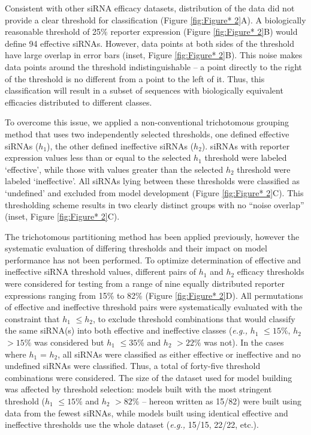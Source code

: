 \documentclass{report}
\begin{document}
 Consistent with other siRNA efficacy datasets, distribution of the data did not provide a clear threshold for classification (Figure \ref{fig:Figure* 2}A). A biologically reasonable threshold of 25\% reporter expression (Figure \ref{fig:Figure* 2}B) would define 94 effective siRNAs. However, data points at both sides of the threshold have large overlap in error bars (inset, Figure \ref{fig:Figure* 2}B). This noise makes data points around the threshold indistinguishable – a point directly to the right of the threshold is no different from a point to the left of it. Thus, this classification will result in a subset of sequences with biologically equivalent efficacies distributed to different classes. 

 To overcome this issue, we applied a non-conventional trichotomous grouping method that uses two independently selected thresholds, one defined effective siRNAs ($h_1$), the other defined ineffective siRNAs ($h_2$). siRNAs with reporter expression values less than or equal to the selected $h_1$ threshold were labeled ‘effective’, while those with values greater than the selected $h_2$ threshold were labeled ‘ineffective’. All siRNAs lying between these thresholds were classified as ‘undefined’ and excluded from model development (Figure \ref{fig:Figure* 2}C). This thresholding scheme results in two clearly distinct groups with no “noise overlap” (inset, Figure \ref{fig:Figure* 2}C).  

 The trichotomous partitioning method has been applied previously,\cite{shmushkovich_functional_2018} however the systematic evaluation of differing thresholds and their impact on model performance has not been performed. To optimize determination of effective and ineffective siRNA threshold values, different pairs of $h_1$ and $h_2$ efficacy thresholds were considered for testing from a range of nine equally distributed reporter expressions ranging from 15\% to 82\% (Figure \ref{fig:Figure* 2}D). All permutations of effective and ineffective threshold pairs were systematically evaluated with the constraint that $h_1$ $\leq h_2$, to exclude threshold combinations that would classify the same siRNA(s) into both effective and ineffective classes (\textit{e.g.,} $h_1$ $\leq15\%$, $h_2$ $>15\%$ was considered but $h_1$ $\leq35\%$ and $h_2$ $>22\%$ was not). In the cases where $h_1$ = $h_2$, all siRNAs were classified as either effective or ineffective and no undefined siRNAs were classified. Thus, a total of forty-five threshold combinations were considered. The size of the dataset used for model building was affected by threshold selection: models built with the most stringent threshold ($h_1$ $\leq15\%$ and $h_2$ $>82\%$ – hereon written as 15/82) were built using data from the fewest siRNAs, while models built using identical effective and ineffective thresholds use the whole dataset (\textit{e.g.,} 15/15, 22/22, etc.).
\end{document}

